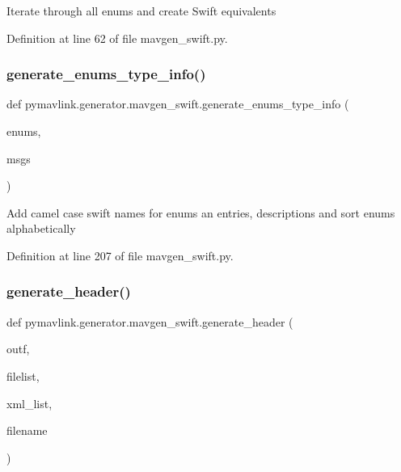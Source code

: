 \begin{DoxyVerb}Iterate through all enums and create Swift equivalents\end{DoxyVerb}
 

Definition at line 62 of file mavgen\+\_\+swift.\+py.

\mbox{\label{namespacepymavlink_1_1generator_1_1mavgen__swift_afb69b33604ef3c1f420f5765fba3a6f3}} 
\subsubsection{\texorpdfstring{generate\_enums\_type\_info()}{generate\_enums\_type\_info()}}
{\footnotesize\ttfamily def pymavlink.\+generator.\+mavgen\+\_\+swift.\+generate\+\_\+enums\+\_\+type\+\_\+info (\begin{DoxyParamCaption}\item[{}]{enums,  }\item[{}]{msgs }\end{DoxyParamCaption})}

\begin{DoxyVerb}Add camel case swift names for enums an entries, descriptions and sort enums alphabetically\end{DoxyVerb}
 

Definition at line 207 of file mavgen\+\_\+swift.\+py.

\mbox{\label{namespacepymavlink_1_1generator_1_1mavgen__swift_af86520c2c9b71b0133a82512d41f7b89}} 
\subsubsection{\texorpdfstring{generate\_header()}{generate\_header()}}
{\footnotesize\ttfamily def pymavlink.\+generator.\+mavgen\+\_\+swift.\+generate\+\_\+header (\begin{DoxyParamCaption}\item[{}]{outf,  }\item[{}]{filelist,  }\item[{}]{xml\+\_\+list,  }\item[{}]{filename }\end{DoxyParamCaption})}

